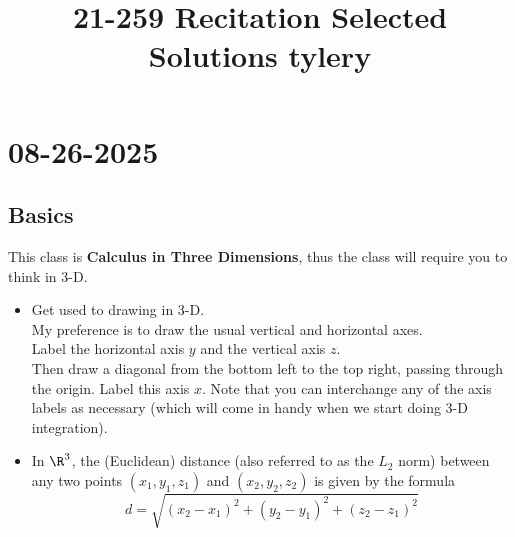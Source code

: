 \documentclass[]{mangos-musings}
\begin{document}
\title{21-259 Recitation Selected Solutions \hfill \small{tylery}}
\tableofcontents

\newpage
\section*{08-26-2025}
\subsection*{Basics}
This class is \textbf{Calculus in Three Dimensions}, thus the class will require you to think in 3-D.
\begin{itemize}
  \item Get used to drawing in 3-D. 
  \\ My preference is to draw the usual vertical and horizontal axes. 
  \\ Label the horizontal axis $y$ and the vertical axis $z$. 
  \\ Then draw a diagonal from the bottom left to the top right, passing through the origin. Label this axis $x$.
  Note that you can interchange any of the axis labels as necessary (which will come in handy when we start doing 3-D integration). 
  \item In $\R^3$, the (Euclidean) distance (also referred to as the $L_2$ norm) between any two points $(x_1, y_1, z_1)$ and $(x_2, y_2, z_2)$
  is given by the formula 
  \[d = \sqrt{(x_2 - x_1)^2 + (y_2 - y_1)^2 + (z_2 - z_1)^2}\]
\end{itemize}
\end{document}
